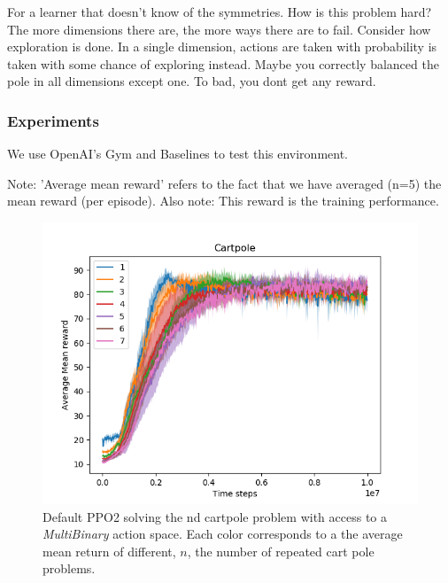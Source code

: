 For a learner that doesn't know of the symmetries. How is this problem hard?
The more dimensions there are, the more ways there are to fail.
Consider how exploration is done. In a single dimension, actions are taken with probability  is
taken with some chance of exploring instead.
Maybe you correctly balanced the pole in all dimensions except one. To bad, you dont get any reward.

\subsubsection{Experiments}

We use OpenAI's Gym \cite{Brockman2016} and Baselines \cite{baselines} to test this environment.


Note: 'Average mean reward' refers to the fact that we have averaged (n=5)
the mean reward (per episode). Also note: This reward is the training performance.

\begin{figure}[h!]
  \centering
  \includegraphics[width=1\textwidth,height=0.5\textheight]{../../pictures/figures/multibinary-nd-cart.png}
  \caption{Default PPO2 solving the nd cartpole problem with access to a \textit{MultiBinary} action space. Each color corresponds to a the average mean return of different, $n$, the number of repeated cart pole problems.}
\end{figure}

